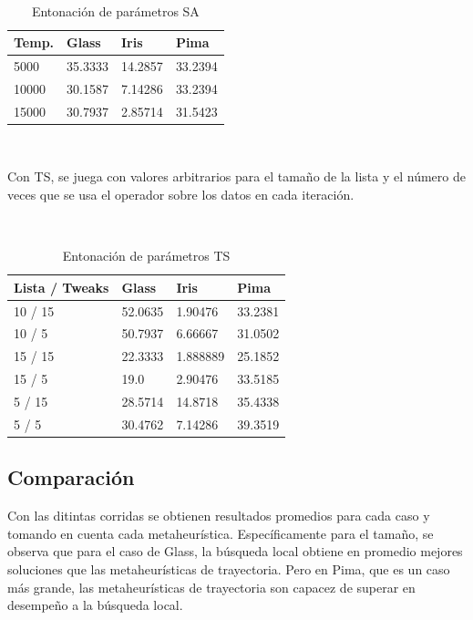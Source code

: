 \documentclass[11pt]{article}
\begin{document}
~\

\begin{table}[h]
\begin{tabular}{ |l|l|l|l| }
    \hline
    Temp. & Glass & Iris & Pima \\ \hline
    5000 & 35.3333 & 14.2857 & 33.2394 \\ \hline
    10000 & 30.1587 & 7.14286 & 33.2394 \\ \hline
    15000 & 30.7937 & 2.85714 & 31.5423 \\ \hline
\end{tabular}
\caption{Entonación de parámetros SA}
\label{tabla:2}
\end{table}

~\


Con TS, se juega con valores arbitrarios para el tamaño de la lista y el número de veces que se usa el operador sobre los datos en cada iteración.

~\

\begin{table}[h]
\begin{tabular}{ |l|l|l|l| }
    \hline
    Lista / Tweaks & Glass & Iris & Pima \\ \hline
    10 / 15 & 52.0635 & 1.90476 & 33.2381 \\ \hline
    10 / 5 & 50.7937 & 6.66667 & 31.0502 \\ \hline
    15 / 15 & 22.3333 & 1.888889 & 25.1852 \\ \hline
    15 / 5 & 19.0 & 2.90476 & 33.5185 \\ \hline
    5 / 15 & 28.5714 & 14.8718 & 35.4338 \\ \hline
    5 / 5 & 30.4762 & 7.14286 & 39.3519 \\ \hline
\end{tabular}
\caption{Entonación de parámetros TS}
\label{tabla:2}
\end{table}

\subsection{Comparación}

Con las ditintas corridas se obtienen resultados promedios para cada caso y tomando en cuenta cada metaheurística. Específicamente para el tamaño, se observa que para el caso de Glass, la búsqueda local obtiene en promedio mejores soluciones que las metaheurísticas de trayectoria. Pero en Pima, que es un caso más grande, las metaheurísticas de trayectoria son capacez de superar en desempeño a la búsqueda local.
\end{document}
